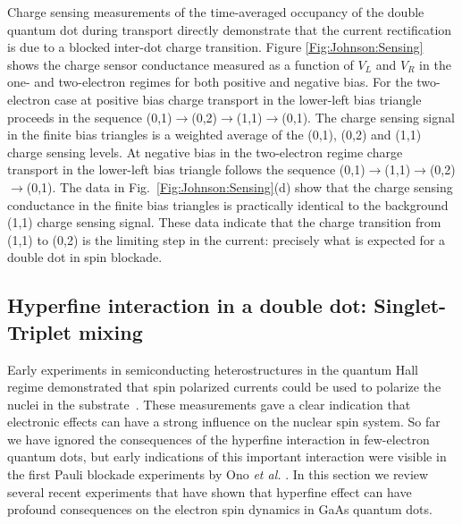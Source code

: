 \documentclass[12pt,aps,nofootinbib]{revtex4-1}
\begin{document}
Charge sensing measurements of the time-averaged occupancy of the
double quantum dot during transport directly demonstrate that the
current rectification is due to a blocked inter-dot charge
transition. Figure \ref{Fig:Johnson:Sensing} shows the charge
sensor conductance measured as a function of $V_L$ and $V_R$ in
the one- and two-electron regimes for both positive and negative
bias. For the two-electron case at positive bias charge transport
in the lower-left bias triangle proceeds in the sequence
(0,1)$\rightarrow$(0,2)$\rightarrow$(1,1)$\rightarrow$(0,1). The
charge sensing signal in the finite bias triangles is a weighted
average of the (0,1), (0,2) and (1,1) charge sensing levels. At
negative bias in the two-electron regime charge transport in the
lower-left bias triangle follows the sequence
(0,1)$\rightarrow$(1,1)$\rightarrow$(0,2)$\rightarrow$(0,1). The
data in Fig.\ \ref{Fig:Johnson:Sensing}(d) show that the charge
sensing conductance in the finite bias triangles is practically
identical to the background (1,1) charge sensing signal. These
data indicate that the charge transition from (1,1) to (0,2) is
the limiting step in the current: precisely what is expected for a
double dot in spin blockade.

\subsection{Hyperfine interaction in a double dot: Singlet-Triplet mixing}
\label{Section:STmixing} Early experiments in semiconducting
heterostructures in the quantum Hall regime demonstrated that spin
polarized currents could be used to polarize the nuclei in the
substrate~\cite{wald94,dixon97}. These measurements gave a clear indication that
electronic effects can have a strong influence on the nuclear spin
system. So far we have ignored the consequences of the hyperfine
interaction in few-electron quantum dots, but early indications of
this important interaction were visible in the first Pauli
blockade experiments by Ono \textit{et al.} \cite{OnoSpinBlock}.
In this section we review several recent experiments that have
shown that hyperfine effect can have profound consequences on the
electron spin dynamics in GaAs quantum dots.
\end{document}
